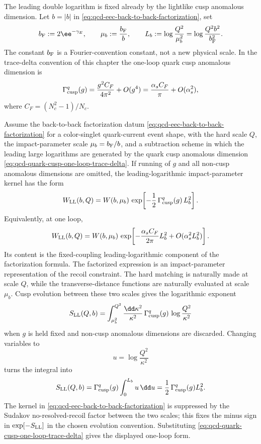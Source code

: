 The leading double logarithm is fixed already by the lightlike cusp anomalous
dimension.  Let \(b=|b|\) in \eqref{eq:qcd-eec-back-to-back-factorization},
set
\[
  b_{\rm F}:=2\ee^{-\gamma_E},\qquad
  \mu_b:=\frac{b_{\rm F}}{b},\qquad
  L_b:=\log\frac{Q^2}{\mu_b^2}
  =
  \log\frac{Q^2b^2}{b_{\rm F}^2}.
\]
The constant \(b_{\rm F}\) is a Fourier-convention constant, not a new
physical scale.  In the trace-delta convention of this chapter the one-loop
quark cusp anomalous dimension is
\begin{equation}
  \Gamma_{\rm cusp}^q(g)
  =
  \frac{g^2C_F}{4\pi^2}+O(g^4)
  =
  \frac{\alpha_s C_F}{\pi}+O(\alpha_s^2),
  \label{eq:qcd-quark-cusp-one-loop-trace-delta}
\end{equation}
where \(C_F=(N_c^2-1)/N_c\).

Assume the back-to-back factorization datum
\eqref{eq:qcd-eec-back-to-back-factorization} for a color-singlet
quark-current event shape, with the hard scale \(Q\), the impact-parameter
scale \(\mu_b=b_{\rm F}/b\), and a subtraction scheme in which the leading
large logarithms are generated by the quark cusp anomalous dimension
\eqref{eq:qcd-quark-cusp-one-loop-trace-delta}.  If running of \(g\) and all
non-cusp anomalous dimensions are omitted, the leading-logarithmic
impact-parameter kernel has the form
\begin{equation}
  W_{\rm LL}(b,Q)
  =
  W(b,\mu_b)\,
  \exp\!\left[
    -\frac12\,\Gamma_{\rm cusp}^q(g)\,L_b^2
  \right].
  \label{eq:qcd-eec-leading-sudakov-factor}
\end{equation}
Equivalently, at one loop,
\[
  W_{\rm LL}(b,Q)
  =
  W(b,\mu_b)\,
  \exp\!\left[
    -\frac{\alpha_s C_F}{2\pi}L_b^2
    +O(\alpha_s^2L_b^2)
  \right].
\]
Its content is the fixed-coupling leading-logarithmic component of the
factorization formula.  The factorized expression is an impact-parameter
representation of the
recoil constraint.  The hard matching is naturally made at scale \(Q\), while
the transverse-distance functions are naturally evaluated at scale
\(\mu_b\).  Cusp evolution between these two scales gives the logarithmic
exponent
\[
  S_{\rm LL}(Q,b)
  =
  \int_{\mu_b^2}^{Q^2}
  \frac{\dd\kappa^2}{\kappa^2}\,
  \Gamma_{\rm cusp}^q(g)\,
  \log\frac{Q^2}{\kappa^2}
\]
when \(g\) is held fixed and non-cusp anomalous dimensions are discarded.
Changing variables to
\[
  u=\log\frac{Q^2}{\kappa^2}
\]
turns the integral into
\[
  S_{\rm LL}(Q,b)
  =
  \Gamma_{\rm cusp}^q(g)
  \int_0^{L_b}u\,\dd u
  =
  \frac12\,\Gamma_{\rm cusp}^q(g)L_b^2.
\]
The kernel in \eqref{eq:qcd-eec-back-to-back-factorization} is suppressed by
the Sudakov no-resolved-recoil factor between the two scales; this fixes the
minus sign in \(\exp[-S_{\rm LL}]\) in the chosen evolution convention.
Substituting
\eqref{eq:qcd-quark-cusp-one-loop-trace-delta} gives the displayed one-loop
form.

